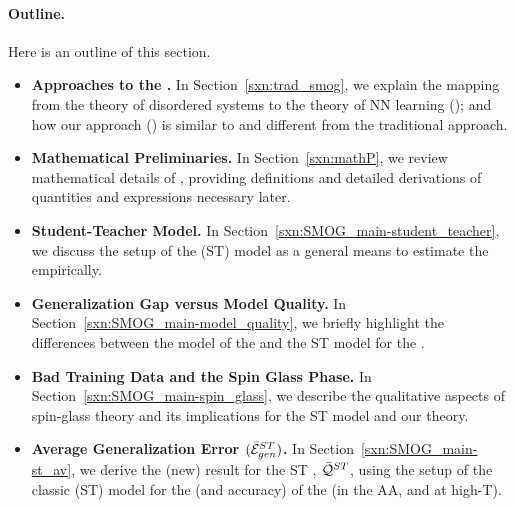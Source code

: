 \paragraph{Outline.}
Here is an outline of this section.
\begin{itemize} %
\item
  \textbf{Approaches to the \SMOG.}
  In Section~\ref{sxn:trad_smog}, we explain the mapping from the \STATMECH theory of disordered systems
    to the \STATMECH theory of NN learning (\SMOG); and how our \SemiEmpirical approach (\SETOL)
    is similar to and different from the traditional approach.

  \item
      \textbf{Mathematical Preliminaries.}
    In Section~\ref{sxn:mathP}, we review mathematical details of \STATMECH, providing definitions
      and detailed derivations of quantities and expressions necessary later.  

    \item
        \textbf{Student-Teacher Model.}
      In Section~\ref{sxn:SMOG_main-student_teacher}, we discuss the setup of the \StudentTeacher (ST) model
    as a general means to estimate the \AverageGeneralizationError empirically. 

  \item
      \textbf{Generalization Gap versus Model Quality.}
    In Section~\ref{sxn:SMOG_main-model_quality}, we briefly highlight the differences between the \STATMECH model
    of the \GeneralizationAccuracy and the ST model for the \GeneralizationGap.

  \item
      \textbf{Bad Training Data and the Spin Glass Phase.}
    In Section~\ref{sxn:SMOG_main-spin_glass}, we describe the qualitative aspects of spin-glass theory
    and its implications for the ST model and our \SETOL theory.

  \item
      \textbf{Average Generalization Error $(\bar{\mathcal{E}}^{ST}_{gen})$.}
    In Section~\ref{sxn:SMOG_main-st_av}, we derive the (new) result for the
    ST \ModelQuality, $\bar{\mathcal{Q}}^{ST}$, using the setup of the classic (ST) model for the
    \GeneralizationError (and accuracy) of the \Perceptron (in the AA, and at high-T).
\end{itemize} %

